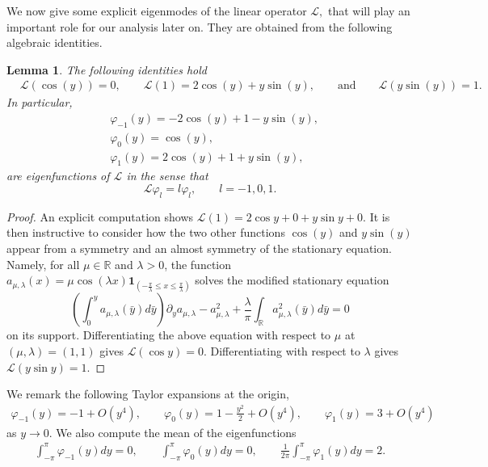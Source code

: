 \documentclass[12pt]{amsart}
\numberwithin{equation}{section}
\numberwithin{equation}{section}
\newtheorem{lem}[thm]{Lemma}
\newcommand{\cpcomment}[1]{\ \newline\textcolor{darkblue}{+++++++++++++++++++++}\newline
\textcolor{darkblue}{#1}\newline\textcolor{darkblue}{+++++++++++++++++++++}\newline
}
\begin{document}
 
We now give some explicit eigenmodes of the linear operator $\mathcal{L},$ that will play an important role for our analysis later on. They are obtained from the following algebraic identities.
 
 
 \begin{lem}\label{Le-3.1}
The following identities hold
 \begin{align*}
&  \mathcal L(\cos(y))=0,\qquad  \mathcal L(1)=2\cos (y)+y \sin (y),\qquad \mbox{and} \qquad \mathcal L(y\sin(y))=1.
 \end{align*}
In particular,
\begin{align*}
& \varphi_{-1}(y)=-2\cos(y)+1-y\sin (y) ,\\
&  \varphi_{0}(y)=\cos(y) ,\\
&  \varphi_{1}(y)=2\cos(y)+1+y\sin(y),
\end{align*}
are eigenfunctions of $\mathcal L$ in the sense that
$$
\mathcal L \varphi_l= l\varphi_l, \qquad l=-1,0,1.
$$


\end{lem}


\begin{proof}
 
An explicit computation shows $\mathcal L (1)=2\cos y +0+y\sin y +0$. It is then instructive to consider how the two other functions $\cos(y)$ and $y\sin(y)$ appear from a symmetry and an almost symmetry of the stationary equation. Namely, for all $\mu \in \mathbb R$ and $\lambda>0$, the function $a_{\mu,\lambda}(x)= \mu \cos(\lambda x){\mathbf{1}_{(-\frac{\pi}{\lambda}\leq x \leq \frac{\pi}{\lambda})}}$ solves the modified stationary equation
$$
\left(\int_0^y a_{\mu,\lambda}(\bar y)d\bar y\right)\partial_y a_{\mu,\lambda}- a_{\mu,\lambda}^2+\frac{\lambda}{\pi} \int_{\mathbb R} a_{\mu,\lambda}^2(\bar y)d\bar y =0
$$
on its support. Differentiating the above equation with respect to $\mu$ at $(\mu,\lambda)=(1,1)$ gives $\mathcal L(\cos y)=0$. Differentiating with respect to $\lambda$ gives $\mathcal L(y\sin y)=1$.
\end{proof}


We remark the following Taylor expansions at the origin,
\begin{align} \label{taylor-origin-eigenfunctions}
 \varphi_{-1}(y)= -1+O(y^4), \qquad  \varphi_{0}(y)=1-\frac{y^2}{2}+O(y^4), \qquad \varphi_{1}(y)=3+O(y^4)
\end{align}
as $y\to 0$. We also compute the mean of the eigenfunctions
\begin{align} \label{mean-eigenfunctions}
\int_{-\pi}^\pi \varphi_{-1}(y)dy=0, \qquad \int_{-\pi}^\pi \varphi_{0}(y)dy=0, \qquad \frac{1}{2\pi}\int_{-\pi}^\pi \varphi_{1}(y)dy=2.
\end{align}
\end{document}
